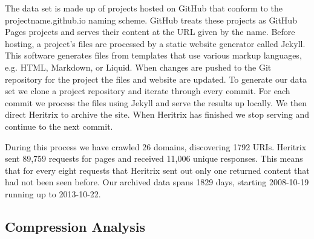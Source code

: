 \documentclass[11pt]{article}
\begin{document}
The data set is made up of projects hosted on GitHub that conform to the projectname.github.io naming scheme. GitHub treats these projects as GitHub Pages projects and serves their content at the URL given by the name. Before hosting, a project's files are processed by a static website generator called Jekyll\footnotemark. This software generates files from templates that use various markup languages, e.g. HTML, Markdown, or Liquid. When changes are pushed to the Git repository for the project the files and website are updated. To generate our data set we clone a project repository and iterate through every commit. For each commit we process the files using Jekyll and serve the results up locally. We then direct Heritrix to archive the site. When Heritrix has finished we stop serving and continue to the next commit.

During this process we have crawled 26 domains, discovering 1792 URIs. Heritrix sent 89,759 requests for pages and received 11,006 unique responses. This means that for every eight requests that Heritrix sent out only one returned content that had not been seen before. Our archived data spans 1829 days, starting 2008-10-19 running up to 2013-10-22.



\subsection{Compression Analysis}
\end{document}
